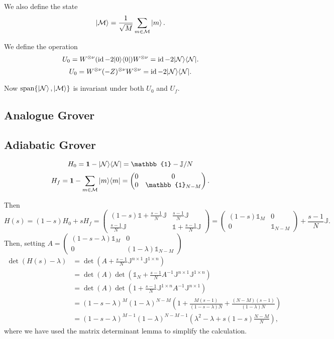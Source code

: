 We also define the state
\[ \left| \mathcal{M} \right\rangle = \frac{1}{\sqrt{M}}\sum_{m\in\mathcal{M}}\left| m \right\rangle. \]

We define the operation
\[ U_0 = W^{\otimes\nu}(\operatorname{id} - 2|0\rangle\langle0|)W^{\otimes\nu}= \operatorname{id} - 2|\mathcal{N}\rangle\langle\mathcal{N}|. \]
\[ U_0 = W^{\otimes\nu}(-Z)^{\otimes \nu}W^{\otimes\nu}= \operatorname{id} - 2|\mathcal{N}\rangle\langle\mathcal{N}|. \]

Now $\operatorname{span}\{\left| \mathcal{N} \right\rangle, \left| \mathcal{M} \right\rangle\}$ is invariant under both $U_0$ and $U_f$.

\subsection{Analogue Grover}



\subsection{Adiabatic Grover}
\[ H_0 = \vec{1} - \ketbra{\mathcal{N}}{\mathcal{N}} = \mathbb{1}-\mathbb{J}/N \]
\[ H_f = \vec{1} - \sum_{m\in\mathcal{M}}\ketbra{m}{m} = \begin{pmatrix}
0 & 0 \\ 0 & \mathbb{1}_{N-M}
\end{pmatrix}.\]

Then
\[ H(s) = (1-s)H_0 + sH_f = \begin{pmatrix}
(1-s)\mathbb{1} +\frac{s-1}{N}\mathbb{J} & \frac{s-1}{N}\mathbb{J} \\
\frac{s-1}{N}\mathbb{J} & \mathbb{1} + \frac{s-1}{N}\mathbb{J}
\end{pmatrix} = \begin{pmatrix}
(1-s)\mathbb{1}_M & 0 \\ 0 & \mathbb{1}_{N-M}
\end{pmatrix} + \frac{s-1}{N}\mathbb{J}. \]
Then, setting $A = \begin{pmatrix}
(1-s-\lambda)\mathbb{1}_M & 0 \\ 0 & (1-\lambda)\mathbb{1}_{N-M}
\end{pmatrix}$
\begin{align*}
\det(H(s)-\lambda) &= \det \left(A + \frac{s-1}{N}\mathbb{J}^{n\times 1}\mathbb{J}^{1\times n}\right) \\
&= \det(A)\det \left(\mathbb{1}_N + \frac{s-1}{N}A^{-1}\mathbb{J}^{n\times 1}\mathbb{J}^{1\times n}\right) \\
&= \det(A)\det \left(1 + \frac{s-1}{N}\mathbb{J}^{1\times n}A^{-1}\mathbb{J}^{n\times 1}\right) \\
&= (1-s-\lambda)^{M}(1-\lambda)^{N-M}\left(1 + \frac{M(s-1)}{(1-s-\lambda)N} + \frac{(N-M)(s-1)}{(1-\lambda)N}\right) \\
&= (1-s-\lambda)^{M-1}(1-\lambda)^{N-M-1}\left(\lambda^2 - \lambda + s(1-s)\frac{N-M}{N}\right),
\end{align*}
where we have used the matrix determinant lemma to simplify the calculation.


